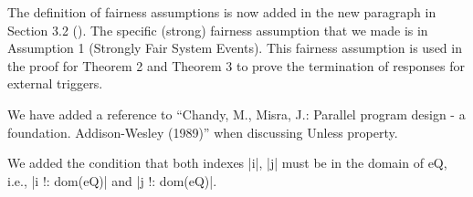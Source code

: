 \documentclass{response}
\begin{document}
\begin{response}
  The definition of fairness assumptions is now added in the new
  paragraph in Section 3.2 (\EventB).  The specific (strong) fairness
  assumption that we made is in Assumption 1 (Strongly Fair System
  Events). This fairness assumption is used in the proof for Theorem 2
  and Theorem 3 to prove the termination of responses for external
  triggers.
\end{response}


\begin{comment}{Reviewer \#1}
• p.25 A reference to the seminal Unless of Unity could be in order.
\end{comment}

\begin{response}
  We have added a reference to ``Chandy, M., Misra, J.: Parallel
  program design - a foundation. Addison-Wesley (1989)'' when
  discussing Unless property.
\end{response}


\begin{comment}{Reviewer \#1}
• p. 26 (Theorem 5) I think that the indexes in eQ should be first stated
as legal in both quantifications.
\end{comment}

\begin{response}
  We added the condition that both indexes |i|, |j| must be in the
  domain of eQ, i.e., |i !: dom(eQ)| and |j !: dom(eQ)|.
\end{response}


\begin{comment}{Reviewer \#1}
• p. 27 All the temporal proofs have been done in an adhoc way without
any tool support. It would be interesting to have a feedback about
this? To be provocative, if you are interested in temporal proofs why
did you choose this tool? Have you considered TLA which does support
temporal proofs (as well as refinements in a certain way)?
\end{comment}
\end{document}
